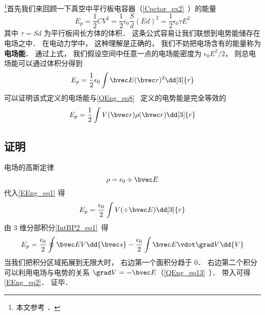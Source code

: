 

\footnote{本文参考 \cite{GriffE}．}首先我们来回顾一下真空中平行板电容器（\autoref{Cpctor_ex2}~）的能量
\begin{equation}
E_p = \frac12 CV^2 = \frac12 \epsilon_0 \frac Sd (Ed)^2 = \frac 12 \epsilon_0 \tau E^2
\end{equation}
其中 $\tau = Sd$ 为平行板间长方体的体积． 这条公式容易让我们联想到电势能储存在电场之中． 在电动力学中， 这种理解是正确的， 我们不妨把电场含有的能量称为\textbf{电场能}． 通过上式， 我们假设空间中任意一点的电场能密度为 $\epsilon_0 E^2/2$， 则总电场能可以通过体积分得到
\begin{equation}\label{EEng_eq2}
E_p = \frac12 \epsilon_0 \int \bvec E(\bvec r)^2 \dd[3]{r}
\end{equation}
可以证明该式定义的电场能与\autoref{QEng_eq8}~ 定义的电势能是完全等效的
\begin{equation}\label{EEng_eq1}
E_p = \frac 12 \int V(\bvec r) \rho(\bvec r) \dd[3]{r}
\end{equation}

\subsection{证明}

电场的高斯定律
\begin{equation}
\rho = \epsilon_0\div \bvec E
\end{equation}
代入\autoref{EEng_eq1} 得
\begin{equation}
E_p = \frac{\epsilon_0}2 \int V (\div \bvec E) \dd[3]{r}
\end{equation}
由 3 维分部积分\autoref{IntBP2_eq1}~得
\begin{equation}
E_p = \frac{\epsilon_0}2 \oint \bvec E V \dd{\bvec s} - \frac{\epsilon_0}{2} \int \bvec E \vdot \grad V \dd{V}
\end{equation}
当我们把积分区域拓展到无限大时， 右边第一个面积分趋于 0． 右边第二个积分可以利用电场与电势的关系 $\grad V = -\bvec E$（\autoref{QEng_eq13}~）． 带入可得\autoref{EEng_eq2}． 证毕．

